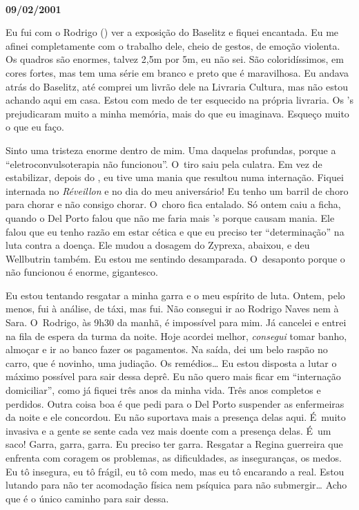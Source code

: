 \begin{center}\asterisc{}​\end{center}


\begin{flushright}\textbf{09/02/2001}\end{flushright}


Eu fui com o Rodrigo () ver a exposição do Baselitz e fiquei
encantada. Eu me afinei completamente com o trabalho dele, cheio de
gestos, de emoção violenta. Os quadros são enormes, talvez 2,5m por 5m,
eu não sei. São coloridíssimos, em cores fortes, mas tem uma série em
branco e preto que é maravilhosa. Eu andava atrás do Baselitz, até
comprei um livrão dele na Livraria Cultura, mas não estou achando aqui
em casa. Estou com medo de ter esquecido na própria livraria. Os 's
prejudicaram muito a minha memória, mais do que eu imaginava. Esqueço
muito o que eu faço.

Sinto uma tristeza enorme dentro de mim. Uma daquelas profundas, porque
a ``eletroconvulsoterapia não funcionou''. O~tiro saiu pela culatra. Em
vez de estabilizar, depois do , eu tive uma mania que resultou numa
internação. Fiquei internada no \emph{Réveillon} e no dia do meu
aniversário! Eu tenho um barril de choro para chorar e não consigo
chorar. O~choro fica entalado. Só ontem caiu a ficha, quando o Del Porto
falou que não me faria mais 's porque causam mania. Ele falou que eu
tenho razão em estar cética e que eu preciso ter ``determinação'' na
luta contra a doença. Ele mudou a dosagem do Zyprexa, abaixou, e deu
Wellbutrin  também. Eu estou me sentindo desamparada. O~desaponto
porque o  não funcionou é enorme, gigantesco.

Eu estou tentando resgatar a minha garra e o meu espírito de luta.
Ontem, pelo menos, fui à análise, de táxi, mas fui. Não consegui ir ao
Rodrigo Naves nem à Sara. O~Rodrigo, às 9h30 da manhã, é impossível para
mim. Já cancelei e entrei na fila de espera da turma da noite. Hoje
acordei melhor, \emph{consegui} tomar banho, almoçar e ir ao banco fazer
os pagamentos. Na saída, dei um belo raspão no carro, que é novinho, uma
judiação. Os remédios… Eu estou disposta a lutar o máximo
possível para sair dessa deprê. Eu não quero mais ficar em ``internação
domiciliar'', como já fiquei três anos da minha vida. Três anos
completos e perdidos. Outra coisa boa é que pedi para o Del Porto
suspender as enfermeiras da noite e ele concordou. Eu não suportava mais
a presença delas aqui. É~muito invasiva e a gente se sente cada vez mais
doente com a presença delas. É~um saco! Garra, garra, garra. Eu preciso
ter garra. Resgatar a Regina guerreira que enfrenta com coragem os
problemas, as dificuldades, as inseguranças, os medos. Eu tô insegura,
eu tô frágil, eu tô com medo, mas eu tô encarando a real. Estou lutando
para não ter acomodação física nem psíquica para não submergir…
Acho que é o único caminho para sair dessa.

